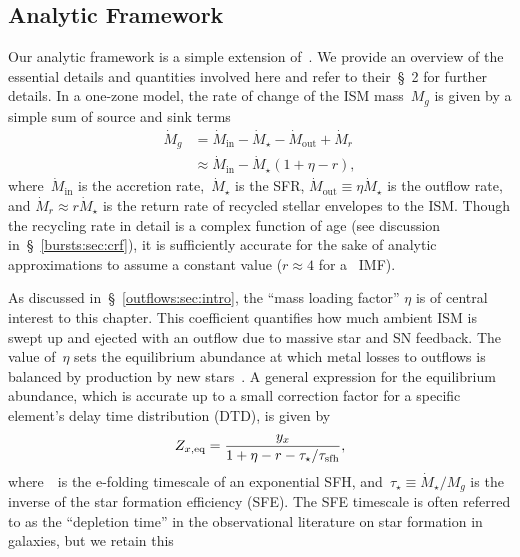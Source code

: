 \subsection{Analytic Framework}
\label{outflows:sec:gce:onezone}
Our analytic framework is a simple extension of~\citet{Weinberg2017b}. We
provide an overview of the essential details and quantities involved here and
refer to their~\S~2 for further details.
In a one-zone model, the rate of change of the ISM mass~$M_g$ is given by a
simple sum of source and sink terms
\begin{equation}\begin{split}
\dot{M}_g &= \dot{M}_\text{in} - \dot{M}_\star - \dot{M}_\text{out} +
\dot{M}_r
\\
&\approx \dot{M}_\text{in} - \dot{M}_\star(1 + \eta - r),
\label{outflows:eq:mdot-gas-noflow}
\end{split}\end{equation}
where~$\dot{M}_\text{in}$ is the accretion rate,~$\dot{M}_\star$ is the SFR,
$\dot{M}_\text{out} \equiv \eta \dot{M}_\star$ is the outflow rate, and
$\dot{M}_r \approx r\dot{M}_\star$ is the return rate of recycled stellar
envelopes to the ISM.
Though the recycling rate in detail is a complex function of age (see
discussion in~\S~\ref{bursts:sec:crf}), it is sufficiently accurate for the
sake of analytic approximations to assume a constant value ($r \approx 4$ for
a~\citealt{Kroupa2001} IMF).
\par
As discussed in~\S~\ref{outflows:sec:intro}, the ``mass loading factor''
$\eta$ is of central interest to this chapter.
This coefficient quantifies how much ambient ISM is swept up and ejected with
an outflow due to massive star and SN feedback.
The value of~$\eta$ sets the equilibrium abundance at which metal losses to
outflows is balanced by production by new stars~\citep[see also][]{Larson1974}.
A general expression for the equilibrium abundance, which is accurate up to a
small correction factor for a specific element's delay time distribution (DTD),
is given by
\begin{equation}
Z_{x,\text{eq}} = \frac{y_x}{1 + \eta - r - \tau_\star / \tau_\text{sfh}},
\label{outflows:eq:zx-eq}
\end{equation}
where~~is the e-folding timescale of an exponential SFH,
and~$\tau_\star \equiv \dot{M}_\star / M_g$ is the inverse of the star
formation efficiency (SFE).
The SFE timescale is often referred to as the ``depletion time'' in the
observational literature on star formation in galaxies, but we retain this
